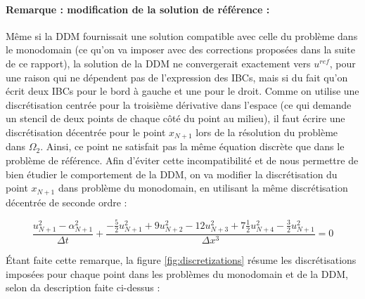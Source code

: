 \paragraph{Remarque : modification de la solution de référence :}

\indent Même si la DDM fournissait une solution compatible avec celle du problème dans le monodomain (ce qu'on va imposer avec des corrections proposées dans la suite de ce rapport), la solution de la DDM ne convergerait exactement vers $u^{ref}$, pour une raison qui ne dépendent pas de l'expression des IBCs, mais si du fait qu'on écrit deux IBCs pour le bord à gauche et une pour le droit. Comme on utilise une discrétisation centrée pour la troisième dérivative dans l'espace (ce qui demande un stencil de deux points de chaque côté du point au milieu), il faut écrire une discrétisation décentrée pour le point $x_{N+1}$  lors de la résolution du problème dans $\Omega_2$. Ainsi, ce point ne satisfait pas la même équation discrète que dans le problème de référence. Afin d'éviter cette incompatibilité et de nous permettre de bien étudier le comportement de la DDM, on va modifier la discrétisation du point  $x_{N+1}$ dans problème du monodomain, en utilisant la même discrétisation décentrée de seconde ordre :

\begin{equation*}
    \label{eq:uncenteredFDdiscretizationN}
    \frac{u_{N+1}^2 - \alpha_{N+1}^2}{\Delta t} + \frac{-\frac{5}{2}u_{N+1}^2 + 9u_{N+2}^2 - 12 u_{N+3}^2 + 7\frac{1}{2}u_{N+4}^2 -\frac{3}{2}u_{N+1}^2}{\Delta x ^3} = 0
\end{equation*}

\indent Étant faite cette remarque, la figure \ref{fig:discretizations} résume les discrétisations imposées pour chaque point dans les problèmes du monodomain et de la DDM, selon da description faite ci-dessus :

\indent

